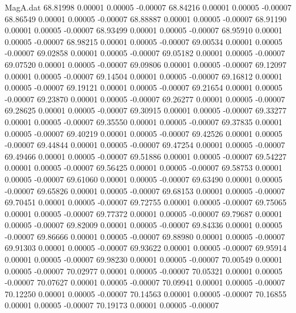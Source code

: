 \begin{filecontents}{MagA.dat}
  68.81998    0.00001    0.00005   -0.00007
  68.84216    0.00001    0.00005   -0.00007
  68.86549    0.00001    0.00005   -0.00007
  68.88887    0.00001    0.00005   -0.00007
  68.91190    0.00001    0.00005   -0.00007
  68.93499    0.00001    0.00005   -0.00007
  68.95910    0.00001    0.00005   -0.00007
  68.98215    0.00001    0.00005   -0.00007
  69.00534    0.00001    0.00005   -0.00007
  69.02858    0.00001    0.00005   -0.00007
  69.05182    0.00001    0.00005   -0.00007
  69.07520    0.00001    0.00005   -0.00007
  69.09806    0.00001    0.00005   -0.00007
  69.12097    0.00001    0.00005   -0.00007
  69.14504    0.00001    0.00005   -0.00007
  69.16812    0.00001    0.00005   -0.00007
  69.19121    0.00001    0.00005   -0.00007
  69.21654    0.00001    0.00005   -0.00007
  69.23870    0.00001    0.00005   -0.00007
  69.26277    0.00001    0.00005   -0.00007
  69.28625    0.00001    0.00005   -0.00007
  69.30915    0.00001    0.00005   -0.00007
  69.33277    0.00001    0.00005   -0.00007
  69.35550    0.00001    0.00005   -0.00007
  69.37835    0.00001    0.00005   -0.00007
  69.40219    0.00001    0.00005   -0.00007
  69.42526    0.00001    0.00005   -0.00007
  69.44844    0.00001    0.00005   -0.00007
  69.47254    0.00001    0.00005   -0.00007
  69.49466    0.00001    0.00005   -0.00007
  69.51886    0.00001    0.00005   -0.00007
  69.54227    0.00001    0.00005   -0.00007
  69.56425    0.00001    0.00005   -0.00007
  69.58753    0.00001    0.00005   -0.00007
  69.61060    0.00001    0.00005   -0.00007
  69.63490    0.00001    0.00005   -0.00007
  69.65826    0.00001    0.00005   -0.00007
  69.68153    0.00001    0.00005   -0.00007
  69.70451    0.00001    0.00005   -0.00007
  69.72755    0.00001    0.00005   -0.00007
  69.75065    0.00001    0.00005   -0.00007
  69.77372    0.00001    0.00005   -0.00007
  69.79687    0.00001    0.00005   -0.00007
  69.82009    0.00001    0.00005   -0.00007
  69.84336    0.00001    0.00005   -0.00007
  69.86666    0.00001    0.00005   -0.00007
  69.88980    0.00001    0.00005   -0.00007
  69.91303    0.00001    0.00005   -0.00007
  69.93622    0.00001    0.00005   -0.00007
  69.95914    0.00001    0.00005   -0.00007
  69.98230    0.00001    0.00005   -0.00007
  70.00549    0.00001    0.00005   -0.00007
  70.02977    0.00001    0.00005   -0.00007
  70.05321    0.00001    0.00005   -0.00007
  70.07627    0.00001    0.00005   -0.00007
  70.09941    0.00001    0.00005   -0.00007
  70.12250    0.00001    0.00005   -0.00007
  70.14563    0.00001    0.00005   -0.00007
  70.16855    0.00001    0.00005   -0.00007
  70.19173    0.00001    0.00005   -0.00007

\end{filecontents}
